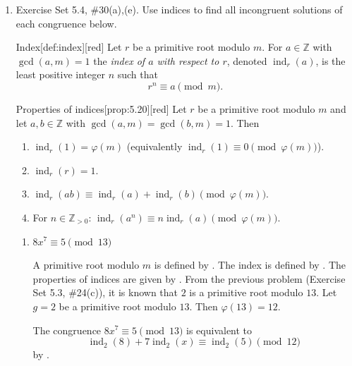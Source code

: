 \begin{enumerate}
  \newpage
  \item Exercise Set 5.4, \#30(a),(e). Use indices to find all incongruent solutions of each congruence below.
  \begin{define}{Index}[def:index][red]
  Let $r$ be a primitive root modulo $m$. For $a\in\mathbb{Z}$ with $\gcd(a,m)=1$ the \emph{index of $a$ with respect to $r$}, denoted $\operatorname{ind}_r(a)$, is the least positive integer $n$ such that
  \[
  r^n\equiv a\pmod m.
  \]
  \end{define}
  \begin{define}{Properties of indices}[prop:5.20][red]
  Let $r$ be a primitive root modulo $m$ and let $a,b\in\mathbb{Z}$ with $\gcd(a,m)=\gcd(b,m)=1$. Then
  \begin{enumerate}
    \item $\operatorname{ind}_r(1)=\varphi(m)$ (equivalently $\operatorname{ind}_r(1)\equiv 0\pmod{\varphi(m)}$).
    \item $\operatorname{ind}_r(r)=1$.
    \item $\operatorname{ind}_r(ab)\equiv \operatorname{ind}_r(a)+\operatorname{ind}_r(b)\pmod{\varphi(m)}$.
    \item For $n\in\mathbb{Z}_{>0}$: $\operatorname{ind}_r(a^n)\equiv n\operatorname{ind}_r(a)\pmod{\varphi(m)}$.
  \end{enumerate}
  \end{define}
  \begin{enumerate}
    \item $8x^7 \equiv 5 \pmod{13}$
    \begin{subanswer}
      A primitive root modulo $m$ is defined by .
      The index is defined by .
      The properties of indices are given by .
      From the previous problem (Exercise Set 5.3, \#24(c)), it is known that $2$ is a primitive root modulo $13$.
      Let $g = 2$ be a primitive root modulo $13$. Then $\varphi(13) = 12$.
      
      The congruence $8x^7 \equiv 5 \pmod{13}$ is equivalent to
      \[
      \operatorname{ind}_2(8) + 7\operatorname{ind}_2(x) \equiv \operatorname{ind}_2(5) \pmod{12}
      \]
      by .
      

\end{subanswer}
\end{enumerate}
\end{enumerate}
